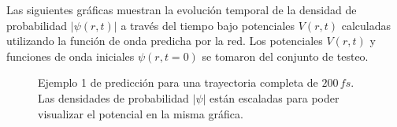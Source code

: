 Las siguientes gráficas muestran la evolución temporal de la densidad de probabilidad $|\psi(r,t)|$ a través del tiempo bajo potenciales $V(r,t)$ calculadas utilizando la función de onda predicha por la red. Los potenciales $V(r,t)$ y funciones de onda iniciales $\psi(r,t=0)$ se tomaron del conjunto de testeo.

\newpage

\begin{figure}[H]
  \centering
  \caption{Ejemplo 1 de predicción para una trayectoria completa de $200\,fs$.\\ Las densidades de probabilidad $|\psi|$ están escaladas para poder visualizar el potencial en la misma gráfica.}
  \label{fig:trajec1}
\end{figure}

